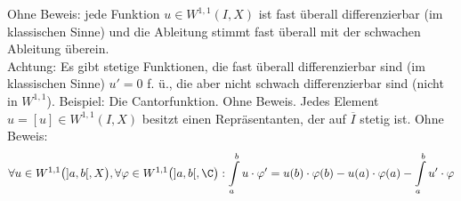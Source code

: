Ohne Beweis: jede Funktion $u\in W^{1,1}(I,X)$ ist fast überall differenzierbar (im klassischen Sinne) und die Ableitung stimmt fast überall mit der schwachen Ableitung überein.\\
Achtung: Es gibt stetige Funktionen, die fast überall differenzierbar sind (im klassischen Sinne) $u'=0$ f. ü., die aber nicht schwach differenzierbar sind (nicht in $W^{1,1}$). Beispiel: Die Cantorfunktion.\nl
Ohne Beweis. Jedes Element $u=[u]\in W^{1,1}(I,X)$ besitzt einen Repräsentanten, der auf $\overline{I}$ stetig ist.\nl
Ohne Beweis:
\begin{align*}
\forall u\in W^{1,1}\big(]a,b[,X\big),\forall\varphi\in W^{1,1}\big(]a,b[,\C\big):
\int\limits_a^b u\cdot\varphi'=u(b)\cdot\varphi(b)-u(a)\cdot\varphi(a)-\int\limits_a^b u'\cdot\varphi
\end{align*}

